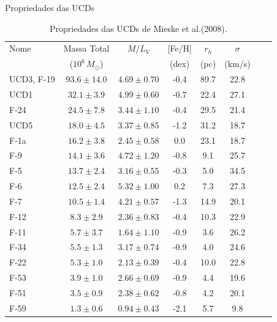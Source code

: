 \begin{frame}[c]{Propriedades das UCDs}
    \begin{table}[!ht]
        \centering
        \scriptsize
        \caption{Propriedades das UCDs de Mieske et al.(2008).}
        \begin{tabular}{lccccccc}
        \toprule
        Nome & Massa Total & $M/L_V$ & [Fe/H] & $r_h$ & $\sigma$ \\
        & ($10^6 \, M_\odot$) & & (dex) & (pc) & (km/s)\\
        \midrule
        UCD3, F-19 & $93.6 \pm 14.0$ & $4.69 \pm 0.70$ & -0.4 & 89.7 & 22.8 \\
        UCD1       & $32.1 \pm 3.9$  & $4.99 \pm 0.60$ & -0.7 & 22.4 & 27.1 \\
        F-24       & $24.5 \pm 7.8$  & $3.44 \pm 1.10$ & -0.4 & 29.5 & 21.4 \\
        UCD5       & $18.0 \pm 4.5$  & $3.37 \pm 0.85$ & -1.2 & 31.2 & 18.7 \\
        F-1a       & $16.2 \pm 3.8$  & $2.45 \pm 0.58$ & 0.0  & 23.1 & 18.7 \\
        F-9        & $14.1 \pm 3.6$  & $4.72 \pm 1.20$ & -0.8 & 9.1  & 25.7 \\
        F-5        & $13.7 \pm 2.4$  & $3.16 \pm 0.55$ & -0.3 & 5.0  & 34.5 \\
        F-6        & $12.5 \pm 2.4$  & $5.32 \pm 1.00$ & 0.2  & 7.3  & 27.3 \\
        F-7        & $10.5 \pm 1.4$  & $4.21 \pm 0.57$ & -1.3 & 14.9 & 20.1 \\
        F-12       & $8.3 \pm 2.9$   & $2.36 \pm 0.83$ & -0.4 & 10.3 & 22.9 \\
        F-11       & $5.7 \pm 3.7$   & $1.64 \pm 1.10$ & -0.9 & 3.6  & 26.2 \\
        F-34       & $5.5 \pm 1.3$   & $3.17 \pm 0.74$ & -0.9 & 4.0  & 24.6 \\
        F-22       & $5.3 \pm 1.0$   & $2.13 \pm 0.39$ & -0.4 & 10.0 & 22.8 \\
        F-53       & $3.9 \pm 1.0$   & $2.66 \pm 0.69$ & -0.9 & 4.4  & 19.6 \\
        F-51       & $3.5 \pm 0.9$   & $2.38 \pm 0.62$ & -0.8 & 4.2  & 20.1 \\
        F-59       & $1.3 \pm 0.6$   & $0.94 \pm 0.43$ & -2.1 & 5.7  & 9.8  \\
        \bottomrule
        \end{tabular}
        \label{ucds_fornax_propriedades}
    \end{table}
\end{frame}

